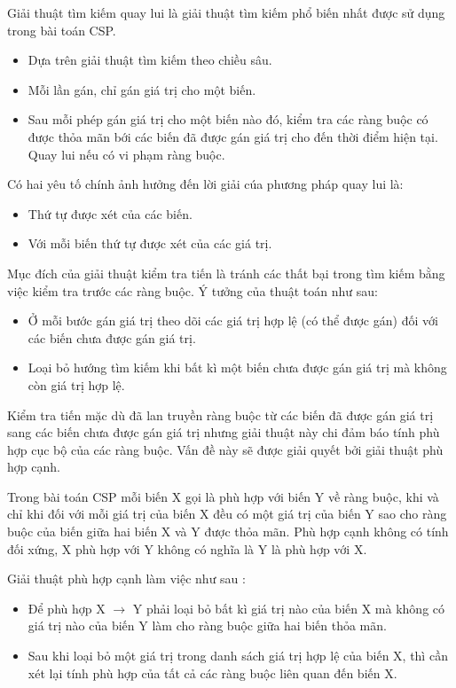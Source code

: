 \documentclass[a4paper,12pt]{report}
\begin{document}
Giải thuật tìm kiếm quay lui là giải thuật tìm kiếm phổ biến nhất được sử dụng trong bài toán CSP. 
\begin{itemize}
\item Dựa trên giải thuật tìm kiếm theo chiều sâu.
\item Mỗi lần gán, chỉ gán giá trị cho một biến.
\item Sau mỗi phép gán giá trị cho một biến nào đó, kiểm tra các ràng buộc có được thỏa mãn bới các biến đã được gán giá trị cho đến thời điểm hiện tại. Quay lui nếu có vi phạm ràng buộc. 
\end{itemize}
Có hai yêu tố chính ảnh hưởng đến lời giải cúa phương pháp quay lui là:
\begin{itemize}
\item Thứ tự được xét của các biến.
\item Với mỗi biến thứ tự được xét của các giá trị.

\end{itemize}

Mục đích của giải thuật kiểm tra tiến là tránh các thất bại trong tìm kiếm bằng việc kiểm tra trước các ràng buộc. Ý tưởng của thuật toán như sau:
\begin{itemize}
\item Ở mỗi bước gán giá trị theo dõi các giá trị hợp lệ (có thể được gán) đối với các biến chưa được gán giá trị. 
\item Loại bỏ hướng tìm kiếm khi bất kì một biến chưa được gán giá trị mà không còn giá trị hợp lệ.
\end{itemize}
Kiểm tra tiến mặc dù đã lan truyền ràng buộc từ các biến đã được gán giá trị sang các biến chưa được gán giá trị nhưng giải thuật này chi đảm báo tính phù hợp cục bộ của các ràng buộc. Vấn đề này sẽ được giải quyết bởi giải thuật phù hợp cạnh. 

Trong bài toán \ac{CSP} mỗi biến X gọi là phù hợp với biến Y về ràng buộc, khi và chỉ khi đối với mỗi giá trị của  biến X đều có một giá trị của biến Y sao cho ràng buộc của biến giữa hai biến X và Y được thỏa mãn. Phù hợp cạnh không có tính đối xứng, X phù hợp với Y không có nghĩa là Y là phù hợp với X. 

Giải thuật phù hợp cạnh làm việc như sau :
\begin{itemize}
\item Để phù hợp X $\rightarrow$ Y phải loại bỏ  bất kì giá trị nào của biến X mà không có giá trị nào của biến Y làm cho ràng buộc giữa hai biến  thỏa mãn.
\item Sau khi loại bỏ một giá trị trong danh sách giá trị hợp lệ của biến  X, thì cần xét lại tính phù hợp của tất cả các ràng buộc liên quan đến biến X.
\end{itemize}
\end{document}
